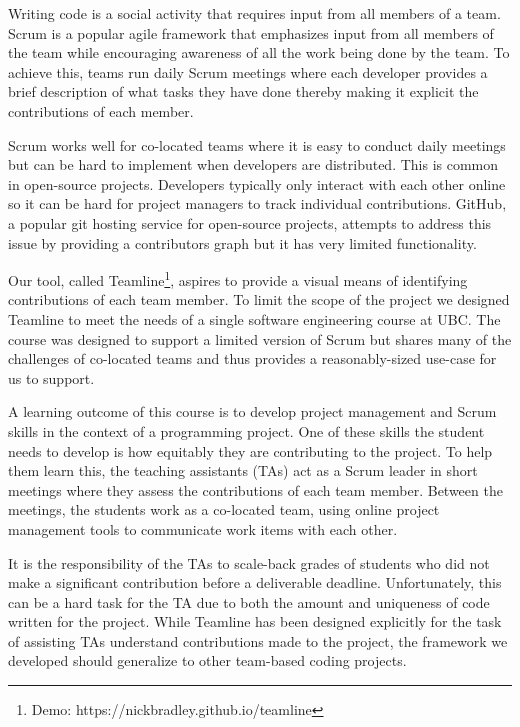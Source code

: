 \documentclass[../manifest.tex]{subfiles}
\begin{document}
Writing code is a social activity that requires input from all members of a team. Scrum is a popular agile framework that emphasizes input from all members of the team while encouraging awareness of all the work being done by the team. To achieve this, teams run daily Scrum meetings where each developer provides a brief description of what tasks they have done thereby making it explicit the contributions of each member.

Scrum works well for co-located teams where it is easy to conduct daily meetings but can be hard to implement when developers are distributed. This is common in open-source projects. Developers typically only interact with each other online so it can be hard for project managers to track individual contributions. GitHub, a popular git hosting service for open-source projects, attempts to address this issue by providing a contributors graph but it has very limited functionality.

Our tool, called Teamline\footnote{Demo: https://nickbradley.github.io/teamline}, aspires to provide a visual means of identifying contributions of each team member. To limit the scope of the project we designed Teamline to meet the needs of a single software engineering course at UBC. The course was designed to support a limited version of Scrum but shares many of the challenges of co-located teams and thus provides a reasonably-sized use-case for us to support.



A learning outcome of this course is to develop project management and Scrum skills in the context of a programming project. One of these skills the student needs to develop is how equitably they are contributing to the project. To help them learn this, the teaching assistants (TAs) act as a Scrum leader in short meetings where they assess the contributions of each team member. Between the meetings, the students work as a co-located team, using online project management tools to communicate work items with each other.

It is the responsibility of the TAs to scale-back grades of students who did not make a significant contribution before a deliverable deadline. Unfortunately, this can be a hard task for the TA due to both the amount and uniqueness of code written for the project. While Teamline has been designed explicitly for the task of assisting TAs understand contributions made to the project, the framework we developed should generalize to other team-based coding projects.
\end{document}
